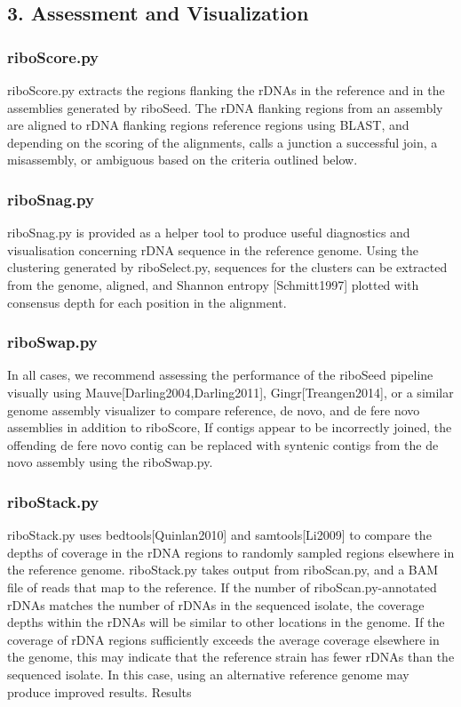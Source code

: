 \documentclass[11pt]{article}
\begin{document}
\begin{linenumbers}
\subsection*{3. Assessment and Visualization}
\subsubsection*{riboScore.py}
riboScore.py extracts the regions flanking the rDNAs in the reference and in the assemblies generated by riboSeed. The rDNA flanking regions from an assembly are aligned to rDNA flanking regions reference regions using BLAST, and depending on the scoring of the alignments, calls a junction a successful join, a misassembly, or ambiguous based on the criteria outlined below.
\subsubsection*{riboSnag.py}
riboSnag.py is provided as a helper tool to produce useful diagnostics and visualisation concerning rDNA sequence in the reference genome. Using the clustering generated by riboSelect.py, sequences for the clusters can be extracted from the genome, aligned, and Shannon entropy [Schmitt1997] plotted with consensus depth for each position in the alignment.
\subsubsection*{riboSwap.py}
In all cases, we recommend assessing the performance of the riboSeed pipeline visually using Mauve[Darling2004,Darling2011], Gingr[Treangen2014], or a similar genome assembly visualizer to compare reference, de novo, and de fere novo assemblies in addition to riboScore, If contigs appear to be incorrectly joined, the offending de fere novo contig can be replaced with syntenic contigs from the de novo assembly using the riboSwap.py.


\subsubsection*{riboStack.py}
riboStack.py uses bedtools[Quinlan2010] and samtools[Li2009] to compare the depths of coverage in the rDNA regions to randomly sampled regions elsewhere in the reference genome. riboStack.py takes output from riboScan.py, and a BAM file of reads that map to the reference. If the number of riboScan.py-annotated rDNAs matches the number of rDNAs in the sequenced isolate, the coverage depths within the rDNAs will be similar to other locations in the genome. If the coverage of rDNA regions sufficiently exceeds the average coverage elsewhere in the genome, this may indicate that the reference strain has fewer rDNAs than the sequenced isolate. In this case, using an alternative reference genome may produce improved results.
Results




\end{linenumbers}
\end{document}
